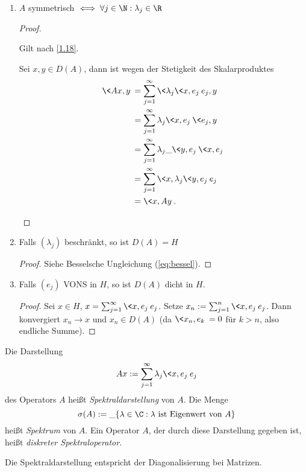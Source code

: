 \documentclass{mycourse}
\begin{document}
\begin{ex}
\begin{enumerate}[1)]
\begin{enumerate}[$\alpha$)]
			\end{enumerate}
		\item
			$A$ symmetrisch $\iff \forall j \in \N : \lambda_j \in \R$
			\begin{proof}
				\begin{seg}[$\implies$]
					Gilt nach \ref{1.18}.
				\end{seg}
				\begin{seg}[$\Longleftarrow$]
					Sei $x,y \in D(A)$, dann ist wegen der Stetigkeit des Skalarproduktes
					\begin{align*}
						\<Ax,y\>
						&= \sum_{j=1}^\infty \<\lambda_j \<x,e_j\> e_j, y\> \\
						&= \sum_{j=1}^\infty \lambda_j \<x,e_j\> \<e_j, y\> \\
						&= \sum_{j=1}^\infty \lambda_j \_{\<y,e_j\>} \<x, e_j\> \\
						&= \sum_{j=1}^\infty \<x,\lambda_j \<y,e_j\> e_j\> \\
						&= \<x, Ay\>.
					\end{align*}
				\end{seg}
			\end{proof}
		\item
			Falls $(\lambda_j)$ beschränkt, so ist $D(A) = H$
			\begin{proof}
				Siehe Besselsche Ungleichung (\ref{eq:bessel}).
			\end{proof}
		\item
			Falls $(e_j)$ VONS in $H$, so ist $D(A)$ dicht in $H$.
			\begin{proof}
				Sei $x \in H$, $x = \sum_{j=1}^\infty \<x,e_j\> e_j$.
				Setze $x_n := \sum_{j=1}^n \<x,e_j\> e_j$.
				Dann konvergiert $x_n \to x$ und $x_n \in D(A)$ (da $\<x_n,e_k\> = 0$ für $k > n$, also endliche Summe).
			\end{proof}
	\end{enumerate}
\end{ex}

\begin{df} \label{1.20}
	Die Darstellung 
	\[
		Ax := \sum_{j=1}^\infty \lambda_j \<x,e_j\> e_j
	\]
	des Operators $A$ heißt \emph{Spektraldarstellung} von $A$.
	Die Menge
	\[
		\sigma(A) := \_{\{\lambda \in \C : \lambda \text{ ist Eigenwert von $A$} \}}
	\]
	heißt \emph{Spektrum} von $A$.
	Ein Operator $A$, der durch diese Darstellung gegeben ist, heißt \emph{diskreter Spektraloperator}.
	\begin{note}
		Die Spektraldarstellung entspricht der Diagonalisierung bei Matrizen.
	\end{note}
\end{df}
\end{document}
